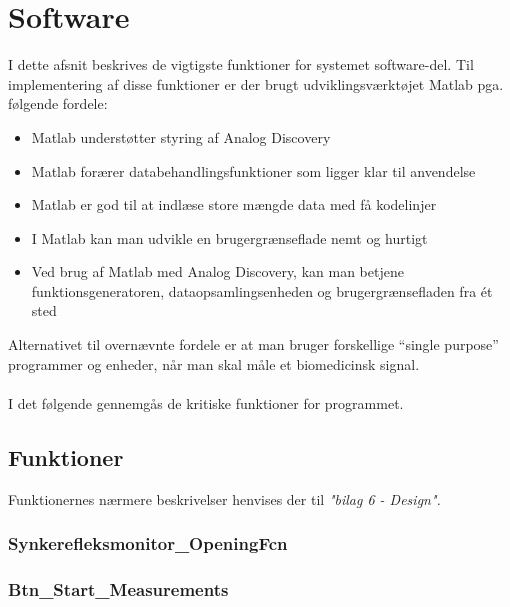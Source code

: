 \section{Software}

I dette afsnit beskrives de vigtigste funktioner for systemet software-del. Til implementering af disse funktioner er der brugt udviklingsværktøjet Matlab pga. følgende fordele:

\begin{itemize}
\item  Matlab understøtter styring af Analog Discovery 
\item Matlab forærer databehandlingsfunktioner som ligger klar til anvendelse
\item Matlab er god til at indlæse store mængde data med få kodelinjer
\item I Matlab kan man udvikle en brugergrænseflade nemt og hurtigt 
\item Ved brug af Matlab med Analog Discovery, kan man betjene  funktionsgeneratoren, dataopsamlingsenheden og brugergrænsefladen  fra ét sted   
\end{itemize}  

Alternativet til overnævnte fordele er at man bruger forskellige “single purpose” programmer og enheder, når man skal måle et biomedicinsk signal. \\ \\
I det følgende gennemgås de kritiske funktioner for programmet.

\pagebreak

\subsection{Funktioner}
Funktionernes nærmere beskrivelser henvises der til \textit{"bilag 6 - Design".}

\subsubsection{Synkerefleksmonitor\_OpeningFcn}





\subsubsection{Btn\_Start\_Measurements}



